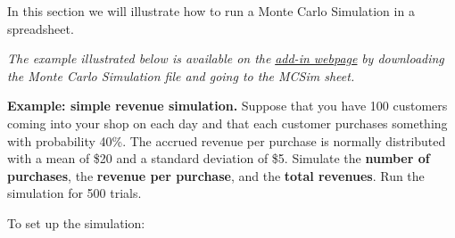 \documentclass[12pt]{article}
\begin{document}
In this section we will illustrate how to run a Monte Carlo Simulation in a spreadsheet.


\textit{The example illustrated below is available on the}  \href{https://www8.gsb.columbia.edu/bizanalytics/excel-add-in/multiplatform#h-4}{ \textit{add-in webpage}}
 \textit{by downloading the Monte Carlo Simulation file and going to the MCSim sheet.}

\textbf{Example: simple revenue simulation.} Suppose that you have 100 customers coming into your shop on each day and that each customer purchases something with probability 40\%. The accrued revenue per purchase is normally distributed with a mean of \$20 and a standard deviation of \$5. Simulate the \textbf{number of purchases}, the \textbf{revenue per purchase}, and the \textbf{total revenues}. Run the simulation for 500 trials.

To set up the simulation:
\end{document}
